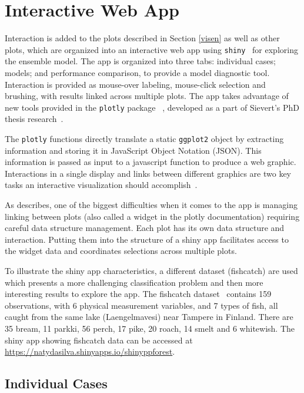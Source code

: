 \documentclass[smallextended,natbib]{svjour3}\usepackage[]{graphicx}\usepackage[]{xcolor}
\begin{document}
\section{Interactive Web App }\label{app}

 Interaction is added to the plots described in Section \ref{visen} as well as other plots, which are organized into an interactive web app using \verb#shiny#~\citep{chang11shiny, wickham2021mastering} for exploring the ensemble model. The app is organized into three tabs: individual cases; models; and performance comparison, to provide a model diagnostic tool. Interaction is provided as mouse-over labeling, mouse-click selection and brushing, with results linked across multiple plots. The app takes advantage of new tools provided in the \verb#plotly# package ~\citep{plotly,sievert2020interactive}, developed as a part of Sievert's PhD thesis research~\citep{sievertthesis}.

The \verb#plotly# functions directly translate a static \verb#ggplot2# object by extracting information and storing it in JavaScript Object Notation (JSON). This information is passed as input to a javascript function to produce a web graphic.  Interactions in a single display and links between different graphics are two key tasks an interactive visualization should accomplish~\citep{xie2014reactive}.

As \cite{sievert2020interactive} describes, one of the biggest difficulties when it comes to the app is managing linking between plots (also called a widget in the plotly documentation) requiring careful data structure management. Each plot has its own data structure and interaction. Putting them into the structure of a shiny app facilitates access to the widget data and coordinates selections across multiple plots.

To illustrate the shiny app characteristics, a different dataset (fishcatch) are used which presents a more challenging classification problem and then more interesting results to explore the app. The fishcatch dataset~\citep{fishcatch} contains 159 observations, with 6 physical measurement variables, and  7 types of fish, all caught from the same lake (Laengelmavesi) near Tampere in Finland. There are 35 bream, 11 parkki, 56 perch, 17 pike, 20 roach, 14 smelt and 6 whitewish. The shiny app showing fishcatch data can be accessed at \url{https://natydasilva.shinyapps.io/shinyppforest}.

\subsection{Individual Cases}
\end{document}
